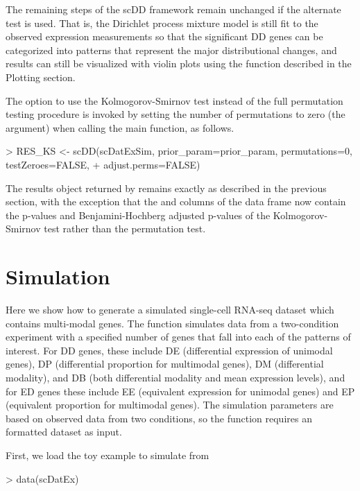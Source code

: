 \documentclass{article}
\begin{document}
The remaining steps of the scDD framework remain unchanged if the alternate test is used.  That is, the Dirichlet process mixture model is still fit to the observed expression measurements so that the significant DD genes can be categorized into patterns that represent the major distributional changes, and results can still be visualized with violin plots using the  function described in the Plotting section.  

The option to use the Kolmogorov-Smirnov test instead of the full permutation testing procedure is invoked by setting the number of permutations to zero (the  argument) when calling the main  function, as follows.  

\begin{Schunk}
\begin{Sinput}
> RES_KS <- scDD(scDatExSim, prior_param=prior_param, permutations=0, testZeroes=FALSE,
+             adjust.perms=FALSE)
\end{Sinput}
\end{Schunk}

The results object returned by  remains exactly as described in the previous section, with the exception that the  and  columns of the  data frame now contain the p-values and Benjamini-Hochberg adjusted p-values of the Kolmogorov-Smirnov test rather than the permutation test. 

\section{Simulation}

Here we show how to generate a simulated single-cell RNA-seq dataset which contains multi-modal genes.  The  function simulates data from a two-condition experiment with a specified number of genes that fall into each of the patterns of interest.  For DD genes, these include DE (differential expression of unimodal genes), DP (differential proportion for multimodal genes), DM (differential modality), and DB (both differential modality and mean expression levels), and for ED genes these include EE (equivalent expression for unimodal genes) and EP (equivalent proportion for multimodal genes).  The simulation parameters are based on observed data from two conditions, so the function requires an  formatted dataset as input.

First, we load the toy example  to simulate from
\begin{Schunk}
\begin{Sinput}
> data(scDatEx)
\end{Sinput}
\end{Schunk}
\end{document}
